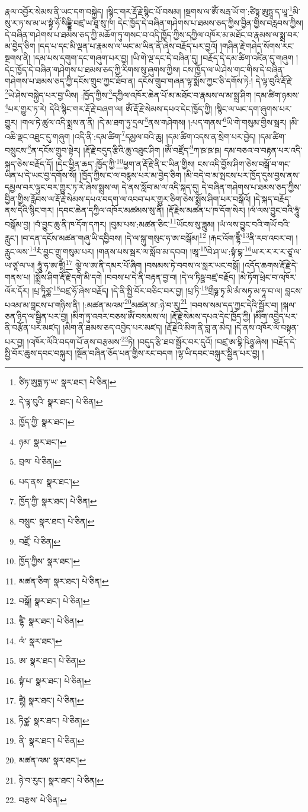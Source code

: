 རྣལ་འབྱོར་སེམས་ནི་ཡང་དག་བསྐྱེད། །སྙིང་གར་རྡོ་རྗེ་སྙིང་པོ་བསམ། །སྔགས་ལ་ཨོཾ་སརྦ་ཡོ་ག་:ཙིཏྟ་ཨུཏྤཱ་ད་ཡཱ་\footnote{ཙིཏ་ཨུཏྨ་ཏ་ཡ་  སྣར་ཐང་།  པེ་ཅིན། }མི་སུ་ར་ཏ་ས་མ་ཡ་སྟྭཾ་ཧོ་སིདྡྷི་བཛྲ་ཡ་ཐཱ་སུ་ཁཾ། དེང་ཁྱོད་དེ་བཞིན་གཤེགས་པ་ཐམས་ཅད་ཀྱིས་བྱིན་གྱིས་བརླབས་ཀྱིས། དེ་བཞིན་གཤེགས་པ་ཐམས་ཅད་ཀྱི་མཆོག་ཏུ་གསང་བ་འདི་ཁྱོད་ཀྱིས་དཀྱིལ་འཁོར་མ་མཐོང་བ་རྣམས་ལ་སྨྲ་བར་མ་བྱེད་ཅིག །དད་པ་དང་མི་ལྡན་པ་རྣམས་ལ་ཡང་མ་ཡིན་ནོ་ཞེས་བརྗོད་པར་བྱའོ། །གཤིན་རྗེ་གཤེད་སོགས་རང་སྔགས་ནི། །དམ་པས་དགུག་དང་གཞུག་པར་བྱ། །ཡི་གེ་ལྔ་དང་དེ་བཞིན་དུ། །བརྗོད་དེ་དམ་ཚིག་འཛིན་དུ་གཞུག །དེང་ཁྱོད་དེ་བཞིན་གཤེགས་པ་ཐམས་ཅད་ཀྱི་རིགས་སུ་ཞུགས་ཀྱིས། ངས་ཁྱོད་ལ་ཡེ་ཤེས་གང་གིས་དེ་བཞིན་གཤེགས་པ་ཐམས་ཅད་ཀྱི་དངོས་གྲུབ་ཀྱང་ཐོབ་ན། དངོས་གྲུབ་གཞན་ལྟ་སྨོས་ཀྱང་ཅི་དགོས་ཏེ:། དེ་ལྟ་བུའི་རྡོ་རྗེ་\footnote{དེ་ལྟ་བུའི་  སྣར་ཐང་།  པེ་ཅིན། }ཡེ་ཤེས་བསྐྱེད་པར་བྱ་ཡིས། :ཁྱོད་ཀྱིས་\footnote{ཁྱོད་ཀྱི་  སྣར་ཐང་། }དཀྱིལ་འཁོར་ཆེན་པོ་མ་མཐོང་བ་རྣམས་ལ་མ་སྨྲ་ཤིག །དམ་ཚིག་ཉམས་\footnote{ཉམ་  སྣར་ཐང་། }པར་གྱུར་ཏ་རེ། དེའི་སྙིང་གར་རྡོ་རྗེ་བཞག་ལ། ཨོཾ་རྡོ་རྗེ་སེམས་དཔའ་དེང་ཁྱོད་ཀྱི། །སྙིང་ལ་ཡང་དག་ཞུགས་པར་གྱུར། །གལ་ཏེ་ཚུལ་འདི་སྨྲས་ན་ནི། །དེ་མ་ཐག་ཏུ་དྲལ་\footnote{བྲལ་  པེ་ཅིན། }ནས་གཤེགས། །:པད་གནས་\footnote{པད་ནས་  སྣར་ཐང་། }ཡི་གེ་གསུམ་གྱིས་སྦར། །མི་འཆི་ལྡང་འཐུང་དུ་གཞུག །འདི་ནི་:དམ་ཚིག་\footnote{ཁྱོད་ཀྱི་  སྣར་ཐང་།  པེ་ཅིན། }དམྱལ་བའི་ཆུ། །དམ་ཚིག་འདས་ན་སྲེག་པར་བྱེད། །དམ་ཚིག་བསྲུངས་\footnote{བསྲུང་  སྣར་ཐང་།  པེ་ཅིན། }ན་དངོས་གྲུབ་སྟེར། །རྡོ་རྗེ་བདུད་རྩིའི་ཆུ་འཐུང་ཤིག །ཨོཾ་བཛྲོད་\footnote{བཛྲོ་  པེ་ཅིན། }ཀ་ཋ་ཋ་ཋ། དམ་བཅའ་བ་བརྟན་པར་འདི་སྐད་ཅེས་བརྗོད་དོ། །དེང་ཕྱིན་ཆད་:ཁྱོད་ཀྱི་\footnote{ཁྱོད་ཀྱིས་  སྣར་ཐང་། }ཕྱག་ན་རྡོ་རྗེ་ནི་ང་ཡིན་གྱིས། ངས་འདི་བྱོས་ཤིག་ཅེས་བསྒོ་བ་གང་ཡིན་པ་དེ་ཡང་བྱ་དགོས་སོ། །ཁྱོད་ཀྱིས་ང་ལ་བརྙས་པར་མ་བྱེད་ཅིག །མི་བདེ་བ་མ་སྤངས་པར་ཁྱོད་དུས་བྱས་ནས་དམྱལ་བར་ལྟུང་བར་གྱུར་ཏ་རེ་ཞེས་སྨྲས་ལ། དེ་ནས་སློབ་མ་ལ་འདི་སྐད་དུ། དེ་བཞིན་གཤེགས་པ་ཐམས་ཅད་ཀྱིས་བྱིན་གྱིས་རློབས་ལ་རྡོ་རྗེ་སེམས་དཔའ་བདག་ལ་འབབ་པར་གྱུར་ཅིག་ཅེས་སྨྲོས་ཤིག་པར་བསྒོའོ། །དེ་སྐད་བརྗོད་ནས་དེའི་སྙིང་གར། །དབང་ཆེན་དཀྱིལ་འཁོར་མཚམས་སུ་ནི། །རྡོ་རྗེས་མཚན་པ་ཁ་དོག་སེར། །ལཾ་ལས་བྱུང་བའི་ཧཱུཾ་བསྒོམ་བྱ། །བཾ་བྱུང་ཆུ་ནི་ཁ་དོག་དཀར། །བུམ་པས་:མཚན་ཅིང་\footnote{མཚན་ཅིག་  སྣར་ཐང་།  པེ་ཅིན། }ཡོངས་སུ་ཟླུམ། །ཡཾ་ལས་བྱུང་བའི་གཡོ་བའི་རླུང་། །བ་དན་དངོས་མཚན་གཞུ་ཡི་དབྱིབས། །དེ་ལ་སྐུ་གསུང་ཧ་ཨ་བསྒོམ།\footnote{བསྒོ།  སྣར་ཐང་།  པེ་ཅིན། } །རྐང་འོག་ཛྷཻཾ་\footnote{ཛྷཻ་  སྣར་ཐང་།  པེ་ཅིན། }ནི་རབ་འབར་བ། །རླུང་ལས་\footnote{ལཾ་  སྣར་ཐང་། }རཾ་བྱུང་གྲུ་གསུམ་པར། །གནས་པས་སྦར་ལ་སློབ་མ་དབབ། །ཨཱ་\footnote{ཨ་  སྣར་ཐང་།  པེ་ཅིན། }བེ་ཤ་ཡ་:སྟཾ་བྷ་\footnote{སྟཾ་པ་  སྣར་ཐང་།  པེ་ཅིན། }ཡ་ར་ར་ར་ར་ཙཱ་ལ་ཡ་ཙཱ་ལ་ཡ། ཧཱུཾ་ཧ་ཨ་ཛྷཻཾ།\footnote{ཛྷཻ།  སྣར་ཐང་།  པེ་ཅིན། } ལྕེ་ལ་ཨ་ནི་དམར་པོ་ཞིག །བསམས་ཏེ་བབས་ལ་སླར་ཡང་བསྒོ། །འདོད་ཆགས་རྡོ་རྗེ་དེ་གནས་པ། །སྨྲོས་ཤིག་རྡོ་རྗེ་དགེ་མི་དགེ །བབས་པ་དེ་ནི་བརྟན་བྱ་བ། །དེ་ལ་ཏིཥྛ་བཛྲ་བརྗོད། །མེ་ཏོག་ཕྲེང་བ་འཁོར་ལོར་དོར། །པྲ་ཏཱིཙྪ་\footnote{ཏིཙྪ་  སྣར་ཐང་།  པེ་ཅིན། }བཛྲ་ཧོ་ཞེས་བརྗོད། །དེ་ནི་སྤྱི་བོར་བཅིང་བར་བྱ། །པྲ་ཏི་\footnote{ནི་  སྣར་ཐང་།  པེ་ཅིན། }གྲྀཧྞ་ཏྭ་མི་མཾ་སཏྭ་མ་ཧཱ་བ་ལ། བླངས་པའམ་མ་བླངས་པ་གཉིས་ནི། །:མཚན་མའམ་\footnote{མཚན་འམ་  སྣར་ཐང་། }མཚན་མ་:ཉེ་བ་རུ།\footnote{ཉེ་བ་རུང་།  སྣར་ཐང་།  པེ་ཅིན། } །བབས་སམ་དད་ཀྱང་དེའི་སྦྱོར་བ། །སྐལ་ཅན་ཉིད་ལ་སྦྱིན་པར་བྱ། །མིག་ཏུ་འབར་བཅས་ཨོཾ་བསམས་ལ། །རྡོ་རྗེ་སེམས་དཔའ་དེང་ཁྱོད་ཀྱི། །མིག་འབྱེད་པར་ནི་བརྩོན་པར་མཛད། །མིག་ནི་ཐམས་ཅད་འབྱེད་པར་མཛད། །རྡོ་རྗེའི་མིག་ནི་བླ་ན་མེད། །དེ་ནས་འཁོར་ལོ་བསྟན་པར་བྱ། །འཁོར་ལོའི་བདག་པོ་ནས་བརྩམས་\footnote{བརྩས་  པེ་ཅིན། }ཏེ། །བདུད་རྩི་ཐབ་སྦྱོར་བར་དུའོ། །བཛྲ་ཨ་བྷི་ཥིཉྩ་ཞེས། །བརྗོད་དེ་སྤྱི་བོར་ཆུས་དབང་བསྐུར། །སྔོན་བཞིན་ཅོད་པན་གྱིས་རང་བདག །ལྷ་ཡི་དབང་བསྐུར་སྦྱིན་པར་བྱ། །
